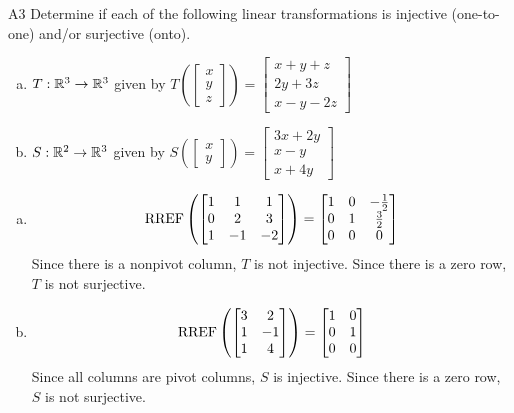 \documentclass{sbgLAexam}
\begin{document}
\begin{extract}\newpage\end{extract}
\begin{problem}{A3}
Determine if each of the following linear transformations is injective (one-to-one) and/or surjective (onto).
\begin{enumerate}[(a)]
\item $T: \mathbb{R}^3 \rightarrow \mathbb{R}^3$ given by $T\left(\begin{bmatrix} x \\ y \\ z  \end{bmatrix} \right) = \begin{bmatrix} x+y+z \\ 2y+3z \\ x-y-2z \end{bmatrix} $
\item $S: \mathbb{R}^2 \rightarrow \mathbb{R}^3$ given by $S\left(\begin{bmatrix} x \\ y  \end{bmatrix} \right) = \begin{bmatrix} 3x+2y \\ x-y \\ x+4y \end{bmatrix} $
\end{enumerate}
\end{problem}
\begin{solution}
\begin{enumerate}[(a)]
\item $$\operatorname{RREF}\left( \begin{bmatrix} 1 &  1 & 1 \\ 0  & 2 & 3 \\ 1  & -1 & -2 \end{bmatrix} \right) = \begin{bmatrix} 1 &  0 & -\frac{1}{2} \\ 0  & 1 & \frac{3}{2} \\ 0& 0 & 0  \end{bmatrix}$$
Since there is a nonpivot column, $T$ is not injective.  Since there is a zero row, $T$ is not surjective.
\item $$\operatorname{RREF} \left( \begin{bmatrix} 3 & 2 \\ 1 & -1 \\ 1 & 4 \end{bmatrix} \right) = \begin{bmatrix} 1 & 0 \\ 0 & 1 \\ 0 & 0 \end{bmatrix}$$
Since all columns are pivot columns, $S$ is injective.  Since there is a zero row, $S$ is not surjective.
\end{enumerate}
\end{solution}
\end{document}
